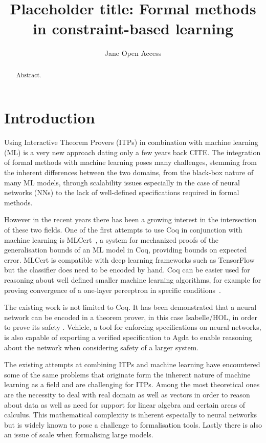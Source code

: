 \documentclass[a4paper,UKenglish,cleveref, autoref, thm-restate]{lipics-v2021}
\title{Placeholder title: Formal methods in constraint-based learning} %
\author{Jane {Open Access}}{Dummy University Computing Laboratory, [optional: Address], Country \and My second affiliation, Country \and \url{http://www.myhomepage.edu} }{johnqpublic@dummyuni.org}{https://orcid.org/0000-0002-1825-0097}{(Optional) author-specific funding acknowledgements}%
\begin{document}
\maketitle

\begin{abstract}
Abstract.
\end{abstract}


\section{Introduction}


Using Interactive Theorem Provers (ITPs) in combination with machine learning (ML) is a very new approach dating only a few years back CITE. 
The integration of formal methods with machine learning poses many challenges, stemming from the inherent differences between the two domains, from the black-box nature of many ML models, through scalability issues especially in the case of neural networks (NNs) to the lack of well-defined specifications required in formal methods. 

However in the recent years there has been a growing interest in the intersection of these two fields. One of the first attempts to use Coq in conjunction with machine learning is MLCert~\cite{bagnall2019certifying}, a system for mechanized proofs of the generalisation bounds of an ML model in Coq, providing bounds on expected error. MLCert is compatible with deep learning frameworks such as TensorFlow but the classifier does need to be encoded by hand. Coq can be easier used for reasoning about well defined smaller machine learning algorithms, for example for proving convergence of a one-layer perceptron in specific conditions~\cite{murphy2017verified}.

The existing work is not limited to Coq. It has been demonstrated that a neural network can be encoded in a theorem prover, in this case Isabelle/HOL, in order to prove its safety \cite{brucker2023verifying}. Vehicle, a tool for enforcing specifications on neural networks, is also capable of exporting a verified specification to Agda to enable reasoning about the network when considering safety of a larger system\cite{daggitt2023compiling}.

The existing attempts at combining ITPs and machine learning have encountered some of the same problems that originate form the inherent nature of machine learning as a field and are challenging for ITPs. Among the most theoretical ones are the necessity to deal with real domain as well as vectors in order to reason about data as well as need for support for linear algebra and certain areas of calculus. This mathematical complexity is inherent especially to neural networks but is widely known to pose a challenge to formalisation tools. Lastly there is also an issue of scale when formalising large models.
\end{document}

